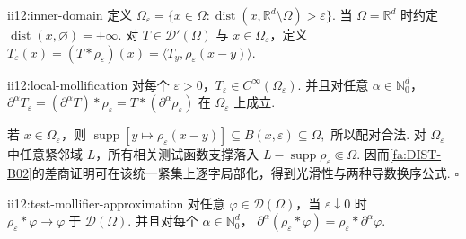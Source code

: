 \begin{FADefinition}[B][内部区域与局部分布磨光]{ii12:inner-domain}
定义 \(\displaystyle \Omega_\varepsilon = \{x\in\Omega:\operatorname{dist}(x,\mathbb R^d\setminus\Omega)>\varepsilon\}.\)
当 \(\displaystyle\Omega=\mathbb R^d\) 时约定 \(\displaystyle\operatorname{dist}(x,\varnothing)=+\infty\).
对 \(\displaystyle T\in\mathcal D'(\Omega)\) 与 \(\displaystyle x\in\Omega_\varepsilon\)，定义 \(\displaystyle T_\varepsilon(x) = (T*\rho_\varepsilon)(x) = \langle T_y,\rho_\varepsilon(x-y)\rangle.\)
\end{FADefinition}

\begin{FAProposition}[B][局部磨光的合法性]{ii12:local-mollification}
对每个 \(\displaystyle\varepsilon>0\)，\(\displaystyle T_\varepsilon\in C^\infty(\Omega_\varepsilon)\). 并且对任意 \(\displaystyle\alpha\in\mathbb N_0^d\)， \(\displaystyle \partial^\alpha T_\varepsilon = (\partial^\alpha T)*\rho_\varepsilon = T*(\partial^\alpha\rho_\varepsilon)\)
在 \(\displaystyle\Omega_\varepsilon\) 上成立.
\end{FAProposition}

\begin{FAProof}
若 \(\displaystyle x\in\Omega_\varepsilon\)，则 \(\displaystyle \operatorname{supp}[y\mapsto\rho_\varepsilon(x-y)] \subseteq \overline{B(x,\varepsilon)} \subseteq \Omega,\)
所以配对合法. 对 \(\displaystyle\Omega_\varepsilon\) 中任意紧邻域 \(\displaystyle L\)，所有相关测试函数支撑落入 \(\displaystyle L-\operatorname{supp}\rho_\varepsilon\Subset\Omega\). 因而\autoref{fa:DIST-B02}的差商证明可在该统一紧集上逐字局部化，得到光滑性与两种导数换序公式.
\hfill\(\square\)
\end{FAProof}

\begin{FAProposition}[B][测试函数的近似恒等式]{ii12:test-mollifier-approximation}
对任意 \(\displaystyle\varphi\in\mathcal D(\Omega)\)，当 \(\displaystyle\varepsilon\downarrow0\) 时 \(\displaystyle \rho_\varepsilon*\varphi \longrightarrow \varphi \;\text{于 }\mathcal D(\Omega).\)
并且对每个 \(\displaystyle\alpha\in\mathbb N_0^d\)， \(\displaystyle \partial^\alpha(\rho_\varepsilon*\varphi) = \rho_\varepsilon*\partial^\alpha\varphi.\)
\end{FAProposition}

